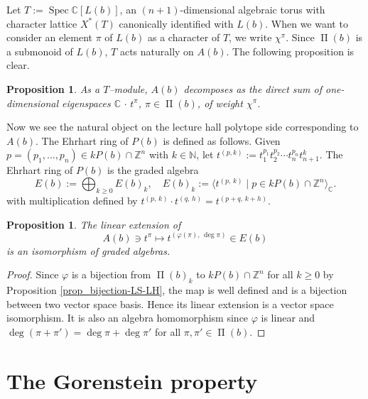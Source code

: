 \documentclass[12pt, a4paper]{amsart}   	%
\numberwithin{equation}{section}
\theoremstyle{plain}
\newtheorem{proposition}[theorem]{Proposition}
\theoremstyle{definition}
\newcommand{\Z}{{\mathbb Z}}
\newcommand{\N}{{\mathbb N}}
\DeclareMathOperator{\LS}{\Pi}
\DeclareMathOperator{\Spec}{Spec}
\newcommand{\CC}{\mathbb{C}}
\begin{document}
Let $T := \Spec\CC[L(b)]$, an $(n+1)$-dimensional algebraic torus with character lattice $X^\ast(T)$ canonically identified with $L(b)$. When we want to consider an element $\pi$ of $L(b)$ as a character of $T$, we write $\chi^\pi$. Since $\LS(b)$ is a submonoid of $L(b)$, $T$ acts naturally on $A(b)$. The following proposition is clear.

\begin{proposition}\label{prop:T-eigenspaces}
As a $T$--module, $A(b)$ decomposes as the direct sum of one-dimensional eigenspaces $\CC\,\cdot\,t^\pi$, $\pi\in\LS(b)$, of weight $\chi^\pi$.
\end{proposition}

\smallskip

Now we see the natural object on the lecture hall polytope side corresponding to $A(b)$. The Ehrhart ring of $P(b)$ is defined as follows. Given $p=(p_1,\ldots,p_n)\in kP(b)\cap \Z^n$ with $k\in\N$, let $t^{(p,k)}:=t_1^{p_1}t_2^{p_2}\cdots t_n^{p_n}t_{n+1}^k$. The Ehrhart ring of $P(b)$ is the graded algebra
\[
E(b) := \bigoplus_{k\geq 0}E(b)_k, \quad E(b)_k := \langle t^{(p,\,k)} \mid p\in kP(b)\cap\Z^n\rangle_\CC.
\]
with multiplication defined by $t^{(p,\,k)}\cdot t^{(q,\,h)} = t^{(p+q,\, k+h)}$.

\begin{proposition}\label{prop:LH-Ehrhart-ring}
    The linear extension of
    \[
    A(b)\ni t^\pi\longmapsto t^{(\varphi(\pi),\,\deg\pi)}\in E(b)
    \]
    is an isomorphism of graded algebras.
\end{proposition}
\begin{proof}
Since $\varphi$ is a bijection from $\LS(b)_k$ to $kP(b)\cap\Z^n$ for all $k\geq 0$ by Proposition \ref{prop_bijection-LS-LH}, the map is well defined and is a bijection between two vector space basis. Hence its linear extension is a vector space isomorphism. It is also an algebra homomorphism since $\varphi$ is linear and $\deg(\pi + \pi') = \deg\pi + \deg\pi'$ for all $\pi, \pi'\in\LS(b)$.
\end{proof}


\section{The Gorenstein property}\label{Sec:5}
\end{document}
